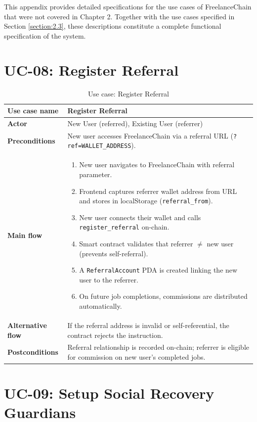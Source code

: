 This appendix provides detailed specifications for the use cases of FreelanceChain that were not covered in Chapter 2. Together with the use cases specified in Section \ref{section:2.3}, these descriptions constitute a complete functional specification of the system.

\section*{UC-08: Register Referral}

\begin{table}[H]
\centering
\caption{Use case: Register Referral}
\begin{tabular}{|l|p{10cm}|}
\hline
\textbf{Use case name} & Register Referral \\ \hline
\textbf{Actor} & New User (referred), Existing User (referrer) \\ \hline
\textbf{Preconditions} & New user accesses FreelanceChain via a referral URL (\texttt{?ref=WALLET\_ADDRESS}). \\ \hline
\textbf{Main flow} & \begin{enumerate}[noitemsep]
    \item New user navigates to FreelanceChain with referral parameter.
    \item Frontend captures referrer wallet address from URL and stores in localStorage (\texttt{referral\_from}).
    \item New user connects their wallet and calls \texttt{register\_referral} on-chain.
    \item Smart contract validates that referrer $\neq$ new user (prevents self-referral).
    \item A \texttt{ReferralAccount} PDA is created linking the new user to the referrer.
    \item On future job completions, commissions are distributed automatically.
\end{enumerate} \\ \hline
\textbf{Alternative flow} & If the referral address is invalid or self-referential, the contract rejects the instruction. \\ \hline
\textbf{Postconditions} & Referral relationship is recorded on-chain; referrer is eligible for commission on new user's completed jobs. \\ \hline
\end{tabular}
\end{table}

\section*{UC-09: Setup Social Recovery Guardians}

